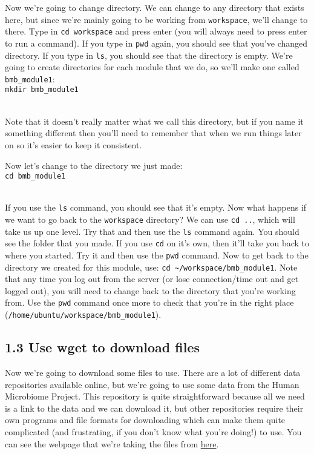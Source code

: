 \documentclass[
]{book}
\begin{document}
Now we're going to change directory. We can change to any directory that exists here, but since we're mainly going to be working from \texttt{workspace}, we'll change to there. Type in \texttt{cd\ workspace} and press enter (you will always need to press enter to run a command). If you type in \texttt{pwd} again, you should see that you've changed directory. If you type in \texttt{ls}, you should see that the directory is empty. We're going to create directories for each module that we do, so we'll make one called \texttt{bmb\_module1}:\\
\texttt{mkdir\ bmb\_module1}\strut \\
Note that it doesn't really matter what we call this directory, but if you name it something different then you'll need to remember that when we run things later on so it's easier to keep it consistent.

Now let's change to the directory we just made:\\
\texttt{cd\ bmb\_module1}\strut \\
If you use the \texttt{ls} command, you should see that it's empty. Now what happens if we want to go back to the \texttt{workspace} directory? We can use \texttt{cd\ ..}, which will take us up one level. Try that and then use the \texttt{ls} command again. You should see the folder that you made. If you use \texttt{cd} on it's own, then it'll take you back to where you started. Try it and then use the \texttt{pwd} command. Now to get back to the directory we created for this module, use: \texttt{cd\ \textasciitilde{}/workspace/bmb\_module1}.
Note that any time you log out from the server (or lose connection/time out and get logged out), you will need to change back to the directory that you're working from. Use the \texttt{pwd} command once more to check that you're in the right place (\texttt{/home/ubuntu/workspace/bmb\_module1}).

\subsection{1.3 Use wget to download files}\label{use-wget-to-download-files}

Now we're going to download some files to use. There are a lot of different data repositories available online, but we're going to use some data from the Human Microbiome Project. This repository is quite straightforward because all we need is a link to the data and we can download it, but other repositories require their own programs and file formats for downloading which can make them quite complicated (and frustrating, if you don't know what you're doing!) to use. You can see the webpage that we're taking the files from \href{https://www.ibdmdb.org/downloads/html/rawfiles_16s_2018-01-08.html}{here}.
\end{document}
